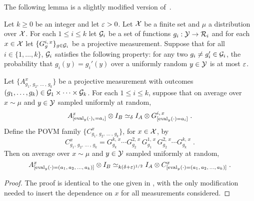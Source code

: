 The following lemma is a slightly modified version of~\cite[Fact~4.34]{NW19}.
\begin{lemma}
  \label{lem:ld-sandwich}
  Let $k \geq 0$ be an integer and let $\varepsilon>0$.
  Let $\mathcal{X}$ be a finite set and $\mu$ a distribution over $\mathcal{X}$.
  For each $1 \leq i \leq k$ let $\mathcal{G}_i$ be a set of functions $g_i : \mathcal{Y}
  \rightarrow \mathcal{R}_i$ and for each $x \in \mathcal{X}$ let $\{G^{i,\, x}_g\}_{g\in
    \mathcal{G}_i}$ be a projective measurement.
  Suppose that for all $i\in \{1,\ldots,k\}$, $\mathcal{G}_i$ satisfies the following
  property: for any two $g_i \neq g_i' \in \mathcal{G}_i$, the probability that $g_i(y)
  = g_i'(y)$ over a uniformly random $y \in \mathcal{Y}$ is at most $\varepsilon$.

  Let $\bigl\{ A^{x}_{g_1,\, g_2,\, \ldots\,,\, g_k} \bigr\}$ be a projective
  measurement with outcomes $(g_1,\ldots,g_k) \in \mathcal{G}_1\times\cdots\times
  \mathcal{G}_k$.
  For each $1 \leq i \leq k$, suppose that on average over $x \sim \mu$ and
  $y\in \mathcal{Y}$ sampled uniformly at random,
  \begin{equation}
    \label{eq:ld-sandwich-1}
    A^{x}_{[\eval_y(\cdot)_i = a_i]} \abc G^{i,\, x}_{[\eval_y(\cdot)=a_i]}\;.
  \end{equation}
  Define the POVM family $\{C^x_{g_1,\, g_2,\, \ldots\,,\, g_k}\}$, for $x\in \mathcal{X}$, by
  \begin{equation*}
    C^x_{g_1,\, g_2,\, \ldots\,,\, g_k} = G^{k,\, x}_{g_k} \cdots
    G^{2,\, x}_{g_2} \, G^{1,\, x}_{g_1} \, G^{2,\, x}_{g_2} \cdots
    G^{k,\, x}_{g_k}\;.
  \end{equation*}
  Then on average over $x\sim \mu$ and $y\in \mathcal{Y}$ sampled uniformly at random,
  \begin{equation}
    \label{eq:ld-sandwich-2}
    A^x_{[\eval_y(\cdot) = (a_1,\, a_2,\, \ldots,\, a_k)]} \abc[k(\delta+\eps)^{1/2}]
    C^x_{[\eval_y(\cdot) = (a_1,\, a_2,\, \ldots,\, a_k)]}\;.
\end{equation}
\end{lemma}

\begin{proof}
  The proof is identical to the one given in \cite[Fact~4.34]{NW19}, with the
  only modification needed to insert the dependence on $x$ for all measurements
  considered.
\end{proof}


